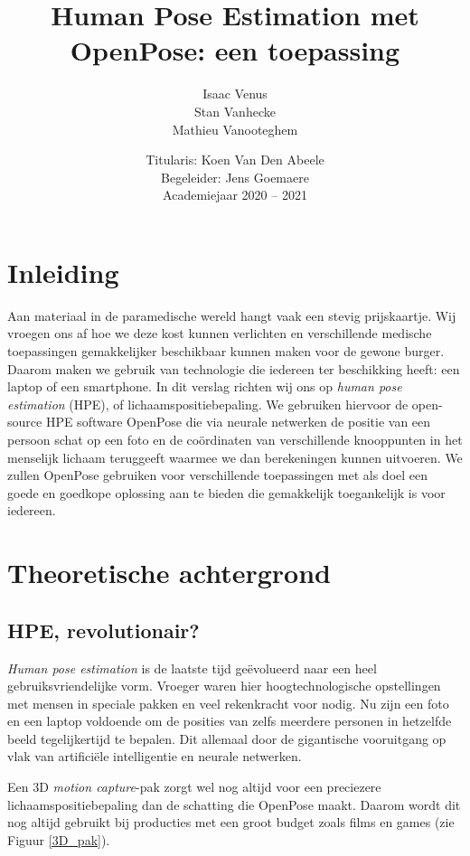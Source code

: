 \documentclass[a4paper,twoside,kulak]{kulakreport}
\title{Human Pose Estimation met OpenPose: een toepassing}
\subtitle{}
\author{Isaac Venus\\Stan Vanhecke\\Mathieu Vanooteghem}
\institute{KU Leuven Kulak, Wetenschap \& Technologie}
\date{Titularis: Koen Van Den Abeele\\Begeleider: Jens Goemaere\\Academiejaar 2020 -- 2021}
\begin{document}

\titlepage

\tableofcontents

\chapter*{Inleiding}
Aan materiaal in de paramedische wereld hangt vaak een stevig prijskaartje. Wij vroegen ons af hoe we deze kost kunnen verlichten en verschillende medische toepassingen gemakkelijker beschikbaar kunnen maken voor de gewone burger. Daarom maken we gebruik van technologie die iedereen ter beschikking heeft: een laptop of een smartphone.
In dit verslag richten wij ons op \emph{human pose estimation} (HPE), of lichaamspositiebepaling. We gebruiken hiervoor de open-source HPE software OpenPose die via neurale netwerken de positie van een persoon schat op een foto en de coördinaten van verschillende knooppunten in het menselijk lichaam teruggeeft waarmee we dan berekeningen kunnen uitvoeren. We zullen OpenPose gebruiken voor verschillende toepassingen met als doel een goede en goedkope oplossing aan te bieden die gemakkelijk toegankelijk is voor iedereen.

\chapter{Theoretische achtergrond}
\section{HPE, revolutionair?}
\emph{Human pose estimation} is de laatste tijd geëvolueerd naar een heel gebruiksvriendelijke vorm. Vroeger waren hier hoogtechnologische opstellingen met mensen in speciale pakken en veel rekenkracht voor nodig. Nu zijn een foto en een laptop voldoende om de posities van zelfs meerdere personen in hetzelfde beeld tegelijkertijd te bepalen. Dit allemaal door de gigantische vooruitgang op vlak van artificiële intelligentie en neurale netwerken.

Een 3D \emph{motion capture}-pak zorgt wel nog altijd voor een preciezere lichaamspositiebepaling dan de schatting die OpenPose maakt. Daarom wordt dit nog altijd gebruikt bij producties met een groot budget zoals films en games (zie Figuur \ref{3D_pak}).
\end{document}
